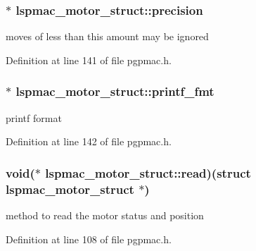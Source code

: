 \hypertarget{structlspmac__motor__struct_a411f12c0ecdc481687d4fbbbec4c5510}{
\subsubsection[{precision}]{$\ast$ lspmac\-\_\-motor\-\_\-struct\-::precision}}\label{structlspmac__motor__struct_a411f12c0ecdc481687d4fbbbec4c5510}


moves of less than this amount may be ignored 



Definition at line 141 of file pgpmac.\-h.

\hypertarget{structlspmac__motor__struct_a25b13b65baf1b28c34012850809b0a3a}{
\subsubsection[{printf\-\_\-fmt}]{$\ast$ lspmac\-\_\-motor\-\_\-struct\-::printf\-\_\-fmt}}\label{structlspmac__motor__struct_a25b13b65baf1b28c34012850809b0a3a}


printf format 



Definition at line 142 of file pgpmac.\-h.

\hypertarget{structlspmac__motor__struct_ac62692eb939c04ca35e939d1c3acfe8f}{
\subsubsection[{read}]{\setlength{\rightskip}{0pt plus 5cm}void($\ast$ lspmac\-\_\-motor\-\_\-struct\-::read)(struct {\bf lspmac\-\_\-motor\-\_\-struct} $\ast$)}}\label{structlspmac__motor__struct_ac62692eb939c04ca35e939d1c3acfe8f}


method to read the motor status and position 



Definition at line 108 of file pgpmac.\-h.

